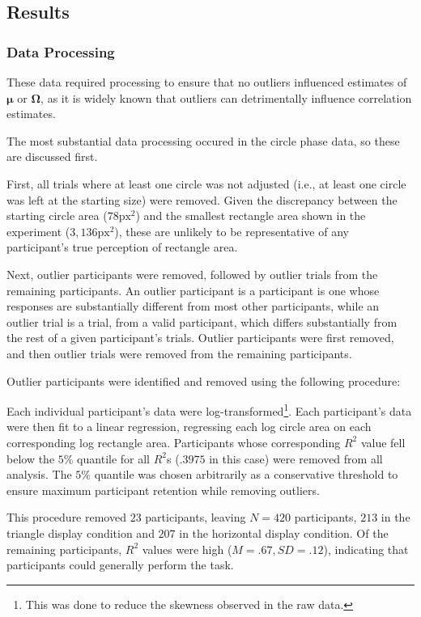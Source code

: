 \subsection{Results}
\subsubsection{Data Processing}

These data required processing to ensure that no outliers influenced estimates of $\boldsymbol{\mu}$ or $\mathbf{\Omega}$, as it is widely known that outliers can detrimentally influence correlation estimates. 

The most substantial data processing occured in the circle phase data, so these are discussed first.

First, all trials where at least one circle was not adjusted (i.e.,
at least one circle was left at the starting size) were removed. Given the discrepancy between the starting circle area ($78\text{px}^2$) and the smallest rectangle area shown in the experiment ($3,136\text{px}^2$), these are unlikely to be representative of any participant's true perception of rectangle area.

Next, outlier participants were removed, followed by outlier trials from the remaining participants. An outlier participant is a participant is one whose responses are substantially different from most other participants, while an outlier trial is a trial, from a valid participant, which differs substantially from the rest of a given participant's trials. Outlier participants were first removed, and then outlier trials were removed from the remaining participants.

Outlier participants were identified and removed using the following procedure:

Each individual participant's data were log-transformed\footnote{This was done to reduce the skewness observed in the raw data.}. Each participant's data were then fit to a linear regression, regressing each log circle area on each corresponding log rectangle area. Participants whose corresponding $R^2$ value fell below the $5\%$ quantile for all $R^2$s ($.3975$ in this case) were removed from all analysis. The $5\%$ quantile was chosen arbitrarily as a conservative threshold to ensure maximum participant retention while removing outliers. 

This procedure removed $23$ participants, leaving $N=420$ participants, $213$ in the triangle display condition and $207$ in the horizontal display condition. Of the remaining participants, $R^2$ values were high ($M=.67,SD=.12$), indicating that participants could generally perform the task.

